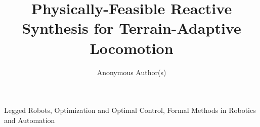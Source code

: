 \documentclass[journal]{IEEEtran}
\title{Physically-Feasible Reactive Synthesis for Terrain-Adaptive Locomotion\\
}
\author{\large Anonymous Author(s)}
\begin{document}
\maketitle



\begin{IEEEkeywords}
Legged Robots, Optimization and Optimal Control,
Formal Methods in Robotics and Automation
\end{IEEEkeywords}













% 















\end{document}

